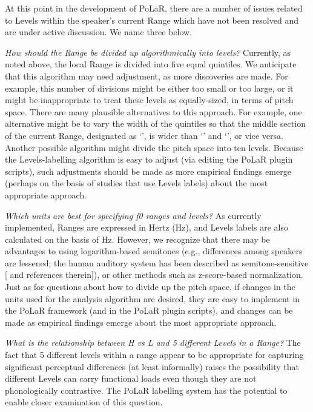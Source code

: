 \documentclass[11pt, twoside]{memoir}
\def\polar#1{{\relsize{-.5}\fontspec[Mapping=tex-text]{Roboto Mono}{#1}}}
\def\polarquot#1{‘\polar{#1}’}
\begin{document}
At this point in the development of PoLaR, there are a number of issues related to Levels within the speaker’s current Range which have not been resolved and are under active discussion.  We name three below.

\textit{How should the Range be divided up algorithmically into levels?} Currently, as noted above, the local Range is divided into five equal quintiles. We anticipate that this algorithm may need adjustment, as more discoveries are made. For example, this number of divisions might be either too small or too large, or it might be inappropriate to treat these levels as equally-sized, in terms of pitch space. There are many plausible alternatives to this approach. For example, one alternative might be to vary the width of the quintiles so that the middle section of the current Range, designated as \polarquot{3}, is wider than \polarquot{1} and \polarquot{5}, or vice versa. Another possible algorithm might divide the pitch space into ten levels. Because the Levels-labelling algorithm is easy to adjust (via editing the PoLaR plugin scripts), such adjustments should be made as more empirical findings emerge (perhaps on the basis of studies that use Levels labels) about the most appropriate approach.

\textit{Which units are best for specifying f0 ranges and levels?} As currently implemented, Ranges are expressed in Hertz (Hz), and Levels labels are also calculated on the basis of Hz. However, we recognize that there may be advantages to using logarithm-based semitones (e.g., differences among speakers are lessened; the human auditory system has been described as semitone-sensitive [\citealt{nolan03} and references therein]), or other methods such as z-score-based normalization. Just as for questions about how to divide up the pitch space, if changes in the units used for the analysis algorithm are desired, they are easy to implement in the PoLaR framework (and in the PoLaR plugin scripts), and changes can be made as empirical findings emerge about the most appropriate approach.

\textit{What is the relationship between H vs L and 5 different Levels in a Range?}  The fact that 5 different levels within a range appear to be appropriate for capturing significant perceptual differences (at least informally) raises the possibility that different Levels can carry functional loads even though they are not phonologically contrastive.  The PoLaR labelling system has the potential to enable closer examination of this question.
\end{document}
